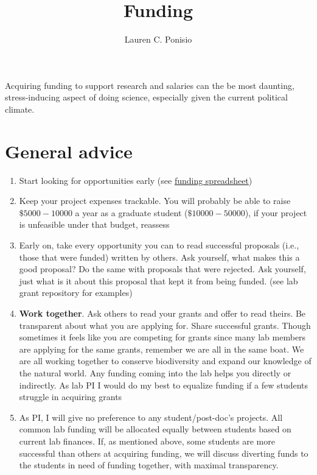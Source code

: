 \documentclass[12pt]{article}
\title{Funding}
\author{Lauren C. Ponisio}
\begin{document}
\maketitle

Acquiring funding to support research and salaries can the be most
daunting, stress-inducing aspect of doing science, especially given
the current political climate.

\section{General advice}

\begin{enumerate}
\item Start looking for opportunities early (see 
  \href{https://docs.google.com/spreadsheets/d/1X2Dyz4HW13hsTmNoUvSoMYOmyobVVtfoGtEtdS0LQtI/edit?usp=sharing}{funding
    spreadsheet}) 
\item Keep your project expenses trackable. You will probably be able
  to raise $\$5000-10000$ a year as a graduate student
  ($\$10000-50000$), if your project is unfeasible under that budget,
  reassess
\item Early on, take every opportunity you can to read successful
  proposals (i.e., those that were funded) written by others. Ask
  yourself, what makes this a good proposal? Do the same with
  proposals that were rejected. Ask yourself, just what is it about
  this proposal that kept it from being funded. (see lab grant
  repository for examples)
\item \textbf{Work together}. Ask others to read your grants and offer
  to read theirs. Be transparent about what you are applying
  for. Share successful grants. Though sometimes it feels like you are
  competing for grants since many lab members are applying for the
  same grants, remember we are all in the same boat. We are all
  working together to conserve biodiversity and expand our knowledge
  of the natural world. Any funding coming into the lab helps you
  directly or indirectly. As lab PI I would do my best to equalize
  funding if a few students struggle in acquiring grants
\item As PI, I will give no preference to any student/post-doc's
  projects. All common lab funding will be allocated equally between
  students based on current lab finances. If, as mentioned above, some
  students are more successful than others at acquiring funding, we will
  discuss diverting funds to the students in need of funding
  together, with maximal transparency. 
\end{enumerate}
\end{document}
